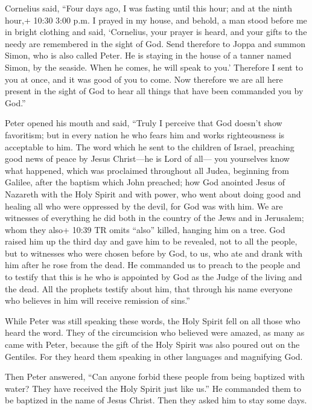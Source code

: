  Cornelius said, ``Four days ago, I was fasting until this
hour; and at the ninth hour,+ 10:30 3:00 p.m. I prayed in my house, and
behold, a man stood before me in bright clothing  and said,
`Cornelius, your prayer is heard, and your gifts to the needy are
remembered in the sight of God.  Send therefore to Joppa
and summon Simon, who is also called Peter. He is staying in the house
of a tanner named Simon, by the seaside. When he comes, he will speak to
you.'  Therefore I sent to you at once, and it was good of
you to come. Now therefore we are all here present in the sight of God
to hear all things that have been commanded you by God.''

 Peter opened his mouth and said, ``Truly I perceive that
God doesn't show favoritism;  but in every nation he who
fears him and works righteousness is acceptable to him. 
The word which he sent to the children of Israel, preaching good news of
peace by Jesus Christ---he is Lord of all---  you
yourselves know what happened, which was proclaimed throughout all
Judea, beginning from Galilee, after the baptism which John preached;
 how God anointed Jesus of Nazareth with the Holy Spirit
and with power, who went about doing good and healing all who were
oppressed by the devil, for God was with him.  We are
witnesses of everything he did both in the country of the Jews and in
Jerusalem; whom they also+ 10:39 TR omits ``also'' killed, hanging him
on a tree.  God raised him up the third day and gave him to
be revealed,  not to all the people, but to witnesses who
were chosen before by God, to us, who ate and drank with him after he
rose from the dead.  He commanded us to preach to the
people and to testify that this is he who is appointed by God as the
Judge of the living and the dead.  All the prophets testify
about him, that through his name everyone who believes in him will
receive remission of sins.''

 While Peter was still speaking these words, the Holy
Spirit fell on all those who heard the word.  They of the
circumcision who believed were amazed, as many as came with Peter,
because the gift of the Holy Spirit was also poured out on the Gentiles.
 For they heard them speaking in other languages and
magnifying God.

Then Peter answered,  ``Can anyone forbid these people from
being baptized with water? They have received the Holy Spirit just like
us.''  He commanded them to be baptized in the name of
Jesus Christ. Then they asked him to stay some days.

